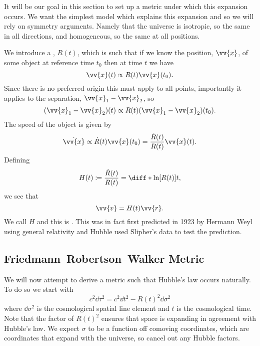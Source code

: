 \documentclass[fleqn]{NotesClass}
\begin{document}
    It will be our goal in this section to set up a metric under which this expansion occurs.
    We want the simplest model which explains this expansion and so we will rely on symmetry arguments.
    Namely that the universe is isotropic, so the same in all directions, and homogeneous, so the same at all positions.
    
    We introduce a , \(R(t)\), which is such that if we know the position, \(\vv{x}\), of some object at reference time \(t_0\) then at time \(t\) we have
    \begin{equation}
        \vv{x}(t) \propto R(t)\vv{x}(t_0).
    \end{equation}
    Since there is no preferred origin this must apply to all points, importantly it applies to the separation, \(\vv{x}_1 - \vv{x}_2\), so
    \begin{equation}
        (\vv{x}_1 - \vv{x}_2)(t) \propto R(t)(\vv{x}_1 - \vv{x}_2)(t_0).
    \end{equation}
    The speed of the object is given by
    \begin{equation}
        \dot{\vv{x}} \propto \dot{R}(t) \vv{x}(t_0) = \frac{\dot{R}(t)}{R(t)}\vv{x}(t).
    \end{equation}
    Defining
    \begin{equation}
        H(t) \coloneqq \frac{\dot{R}(t)}{R(t)} = \diff*{\ln [R(t)]}{t},
    \end{equation}
    we see that
    \begin{equation}
        \vv{v} = H(t) \vv{r}.
    \end{equation}
    We call \(H\)  and this is .
    This was in fact first predicted in 1923 by Hermann Weyl using general relativity and Hubble used Slipher's data to test the prediction.
    
    \subsection{Friedmann--Robertson--Walker Metric}
    We will now attempt to derive a metric such that Hubble's law occurs naturally.
    To do so we start with
    \begin{equation}
        c^2\dd{\tau}^2 = c^2\dd{t}^2 - R(t)^2\dd{\sigma}^2
    \end{equation}
    where \(\dd{\sigma}^2\) is the cosmological spatial line element and \(t\) is the cosmological time.
    Note that the factor of \(R(t)^2\) ensures that space is expanding in agreement with Hubble's law.
    We expect \(\sigma\) to be a function off comoving coordinates, which are coordinates that expand with the universe, so cancel out any Hubble factors.
    
\end{document}
